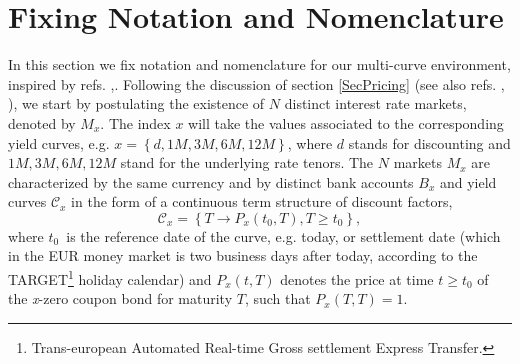 \documentclass[11pt,reqno]{amsart}
\begin{document}
\section{\label{SecMath}Fixing Notation and Nomenclature}
In this section we fix notation and nomenclature for our multi-curve environment, inspired by refs. \cite{Bia09},\cite{Mer09}. Following the discussion of section \ref{SecPricing} (see also refs. \cite{Bia09}, \cite{Mer09}), we start by postulating the existence of $N$ distinct interest rate markets, denoted by $M_{x}$. The index $x$ will take the values associated to the corresponding yield curves, e.g. $x=\left\{d,1M,3M,6M,12M\right\}$, where $d$ stands for discounting and $1M,3M,6M,12M$ stand for the underlying rate tenors. The $N$ markets $M_{x}$ are characterized by the same currency and by distinct bank accounts $B_{x}$ and yield curves $\mathcal{C}_{x}$ in the form of a continuous term structure of discount factors,
\begin{equation}
\mathcal{C}_{x}=\left\{ T\longrightarrow P_{x}\left( t_{0},T\right) ,T\geq t_{0}\right\} ,
\end{equation}
where $t_{0}$\ is the reference date of the curve, e.g. today, or settlement date (which in the EUR money market is two business days after today, according to the TARGET\footnote{Trans-european Automated Real-time Gross settlement Express Transfer.} holiday calendar) and $P_{x}\left(t,T\right)$ denotes the price at time $t\geq t_{0}$ of the \textit{x}-zero coupon bond for maturity $T$, such that $P_{x}\left( T,T\right) =1$.
\end{document}
